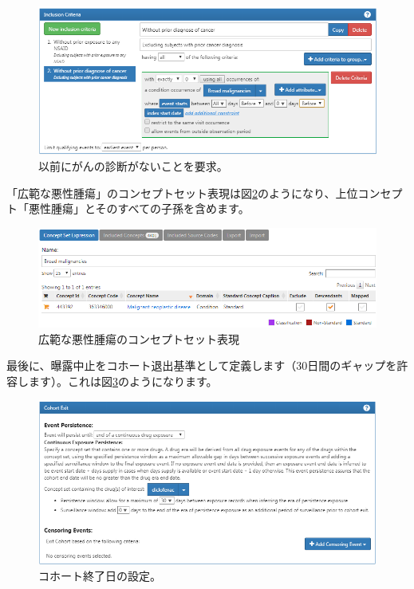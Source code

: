 \documentclass[
  11pt]{book}
\theoremstyle{definition}
\theoremstyle{definition}
\theoremstyle{definition}
\theoremstyle{definition}
\theoremstyle{remark}
\begin{document}
\begin{figure}

{\centering \includegraphics[width=1\linewidth]{images/SuggestedAnswers/cohortsAtlasInclusion2} 

}

\caption{以前にがんの診断がないことを要求。}\label{fig:cohortsAtlasInclusion2}
\end{figure}

「広範な悪性腫瘍」のコンセプトセット表現は図\ref{fig:cohortsAtlasConceptSet3}のようになり、上位コンセプト「悪性腫瘍」とそのすべての子孫を含めます。

\begin{figure}

{\centering \includegraphics[width=1\linewidth]{images/SuggestedAnswers/cohortsAtlasConceptSet3} 

}

\caption{広範な悪性腫瘍のコンセプトセット表現}\label{fig:cohortsAtlasConceptSet3}
\end{figure}

最後に、曝露中止をコホート退出基準として定義します（30日間のギャップを許容します）。これは図\ref{fig:cohortsAtlasExit}のようになります。

\begin{figure}

{\centering \includegraphics[width=1\linewidth]{images/SuggestedAnswers/cohortsAtlasExit} 

}

\caption{コホート終了日の設定。}\label{fig:cohortsAtlasExit}
\end{figure}
\end{document}
